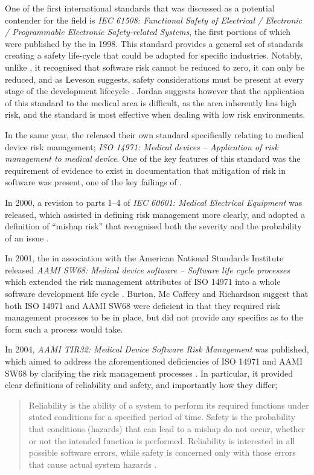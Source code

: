 \documentclass{cshonours}
\begin{document}
One of the first international standards that was discussed as a potential contender for the field is \textit{IEC 61508: Functional Safety of Electrical / Electronic / Programmable Electronic Safety-related Systems}, the first portions of which were published by the \iec in 1998. This standard provides a general set of standards creating a safety life-cycle that could be adapted for specific industries. Notably, unlike \aecl, it recognised that software risk cannot be reduced to zero, it can only be reduced, and as Leveson suggests, safety considerations must be present at every stage of the development lifecycle \cite{iec61508}. Jordan \cite{jordan2006standard} suggests however that the application of this standard to the medical area is difficult, as the area inherently has high risk, and the standard is most effective when dealing with low risk environments.

In the same year, the \iso released their own standard specifically relating to medical device risk management; \textit{ISO 14971: Medical devices -- Application of risk management to medical device}. One of the key features of this standard was the requirement of evidence to exist in documentation that mitigation of risk in software was present, one of the key failings of \aecl \cite{rakitin2006coping}.

In 2000, a revision to parts 1--4 of \textit{IEC 60601: Medical Electrical Equipment} was released, which assisted in defining risk management more clearly, and adopted a definition of ``mishap risk'' that recognised both the severity and the probability of an issue \cite{rakitin2006coping}.

In 2001, the \aami in association with the American National Standards Institute released \textit{AAMI SW68: Medical device software -- Software life cycle processes} which extended the risk management attributes of ISO 14971 into a whole software development life cycle \cite{rakitin2006coping}. Burton, Mc Caffery and Richardson \cite{burton2006risk} suggest that both ISO 14971 and AAMI SW68 were deficient in that they required risk management processes to be in place, but did not provide any specifics as to the form such a process would take.

In 2004, \textit{AAMI TIR32: Medical Device Software Risk Management} was published, which aimed to address the aforementioned deficiencies of ISO 14971 and AAMI SW68 by clarifying the risk management processes \cite{rakitin2006coping}. In particular, it provided clear definitions of reliability and safety, and importantly how they differ;
\begin{quote}
Reliability is the ability of a system to perform its required functions under stated conditions for a specified period of time. Safety is the probability that conditions (hazards) that can lead to a mishap do not occur, whether or not the intended function is performed. Reliability is interested in all possible software errors, while safety is concerned only with those errors that cause actual system hazards \cite{aamitir32}.
\end{quote}
\end{document}
